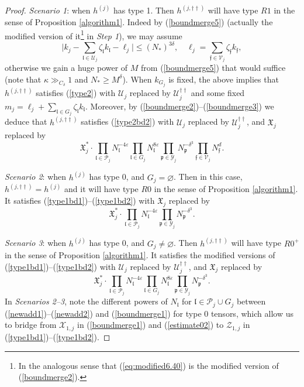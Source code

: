 \documentclass[11 pt,reqno]{amsart}
\theoremstyle{definition}
\theoremstyle{remark}
\numberwithin{equation}{section}
\newcommand{\Pc}{\mathcal{P}}
\newcommand{\Uc}{\mathcal{U}}
\newcommand{\Vc}{\mathcal{V}}
\newcommand{\Xc}{\mathcal{X}}
\newcommand{\Yc}{\mathcal{Y}}
\newcommand{\Zc}{\mathcal{Z}}
\newcommand{\pf}{\mathfrak{p}}
\newcommand{\ff}{\mathfrak{f}}
\newcommand{\Xf}{\mathfrak{X}}
\newcommand{\lf}{\mathfrak{l}}
\begin{document}
{\begin{proof}
\emph{Scenario 1}: when $h^{(j)}$ has type 1. Then $h^{(j,\dagger\dagger)}$ will have type $R1$ in the sense of Proposition \ref{algorithm1}. Indeed by (\ref{boundmerge5}) (actually the modified version of it\footnote{In the analogous sense that (\ref{eq:modified6.40}) is the modified version of (\ref{boundmerge2}).} in \emph{Step 1}), we may assume
\[\bigg|k_j-\sum_{\lf\in\Uc_j}\zeta_\lf k_\lf-\ell_j\bigg|\leq (N_*)^{3\delta},\quad \ell_j=\sum_{\ff\in\Vc_j}\zeta_\ff k_\ff,\] otherwise we gain a huge power of $M$ from (\ref{boundmerge5}) that would suffice (note that $\kappa\gg_{C_\delta}1$ and $N_*\geq M^\delta$). When $k_{G_j}$ is fixed, the above implies that $h^{(j,\dagger\dagger)}$ satisfies (\ref{type2}) with $\Uc_j$ replaced by $\Uc_j^{\dagger\dagger}$ and some fixed $m_j= \ell_j + \sum_{\lf\in G_j}\zeta_\lf k_\lf$. Moreover, by (\ref{boundmerge2})--(\ref{boundmerge3}) we deduce that $h^{(j,\dagger\dagger)}$ satisfies (\ref{type2bd2}) with $\Uc_j$ replaced by $\Uc_j^{\dagger\dagger}$, and $\Xf_j$ replaced by
\[\Xf_j^*\cdot\prod_{\lf\in\Pc_j}N_\lf^{-4\varepsilon}\prod_{\lf\in G_j}N_\lf^{8\varepsilon}\prod_{\pf\in\Yc_j}N_\pf^{-\delta^3}\prod_{\ff\in\Vc_j}N_\ff^d.\]

\emph{Scenario 2}: when $h^{(j)}$ has type 0, and $G_j=\varnothing$. Then in this case, $h^{(j,\dagger\dagger)}=h^{(j)}$  and it will have type $R0$ in the sense of Proposition \ref{algorithm1}. It satisfies (\ref{type1bd1})--(\ref{type1bd2}) with $\Xf_j$ replaced by
\begin{equation}\label{newadd1}\Xf_j^*\cdot\prod_{\lf\in\Pc_j}N_\lf^{-4\varepsilon}\prod_{\pf\in\Yc_j}N_\pf^{-\delta^3}.\end{equation}

\emph{Scenario 3}: when $h^{(j)}$ has type 0, and $G_j\neq\varnothing$. Then $h^{(j,\dagger\dagger)}$ will have type $R0^+$ in the sense of Proposition \ref{algorithm1}. It satisfies the modified versions of (\ref{type1bd1})--(\ref{type1bd2}) with $\Uc_j$ replaced by $\Uc_j^{\dagger\dagger}$, and $\Xf_j$ replaced by
\begin{equation}\label{newadd2}\Xf_j^*\cdot\prod_{\lf\in\Pc_j}N_\lf^{-4\varepsilon}\prod_{\lf\in G_j}N_\lf^{8\varepsilon}\prod_{\pf\in\Yc_j}N_\pf^{-\delta^3}.\end{equation} In \emph{Scenarios 2--3}, note the different powers of $N_\lf$ for $\lf\in \Pc_j\cup G_j$ between (\ref{newadd1})--(\ref{newadd2}) and (\ref{boundmerge1}) for type 0 tensors, which allow us to bridge from $\Xc_{1,j}$ in (\ref{boundmerge1}) and (\ref{estimate02}) to $\Zc_{1,j}$ in (\ref{type1bd1})--(\ref{type1bd2}).


\end{proof}}
\end{document}
